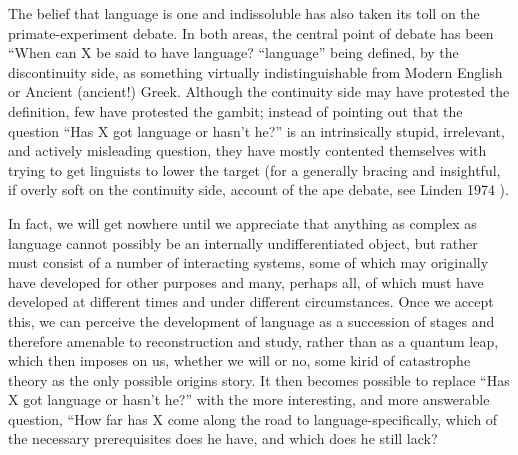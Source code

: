 The belief that language is one and indissoluble has also taken its toll on the primate-experiment debate. In both areas, the central point of debate has been ``When can X be said to have language?{\textquotedbl}\- ``language'' being defined, by the discontinuity side, as something virtually indistinguishable from Modern English or Ancient (ancient!) Greek. Although the continuity side may have protested the definition, few have protested the gambit; instead of pointing out that the ques\-tion ``Has X got language or hasn't he?'' is an intrinsically stupid, irrelevant, and actively misleading question, they have mostly con\-tented themselves with trying to get linguists to lower the target (for a generally bracing and insightful, if overly soft on the continuity side, account of the ape debate, see Linden 1974 ).

In fact, we will get nowhere until we appreciate that anything as complex as language cannot possibly be an internally undifferenti\-ated object, but rather must consist of a number of interacting systems,
some of which may originally have developed for other purposes and many, perhaps all, of which must have developed at different times and under different circumstances. Once we accept this, we can per\-ceive the development of language as a succession of stages and there\-fore amenable to reconstruction and study, rather than as a quantum leap, which then imposes on us, whether we will or no, some kirid of catastrophe theory as the only possible origins story. It then becomes possible to replace ``Has X got language or hasn't he?'' with the more interesting, and more answerable question, ``How far has X come along the road to language-specifically, which of the necessary pre\-requisites does he have, and which does he still lack?{\textquotedbl}

